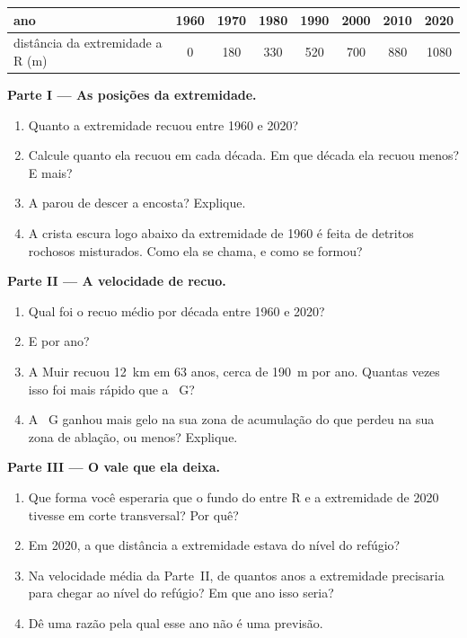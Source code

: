 \begin{problem}
\begin{center}
\smallskip
{\small
\begin{tabular}{|l|c|c|c|c|c|c|c|}
\hline
ano & 1960 & 1970 & 1980 & 1990 & 2000 & 2010 & 2020 \\
\hline
distância da extremidade a R (m) & 0 & 180 & 330 & 520 & 700 & 880 & 1080 \\
\hline
\end{tabular}}
\end{center}

\noindent\textbf{Parte I --- As posições da extremidade.}\par\nopagebreak
\begin{enumerate}[beginpenalty=10000]
  \item Quanto a extremidade recuou entre 1960 e 2020?
  \item Calcule quanto ela recuou em cada década. Em que década ela recuou
        menos? E mais?
  \item A  parou de descer a encosta? Explique.
  \item A crista escura logo abaixo da extremidade de 1960 é feita de
        detritos rochosos misturados. Como ela se chama, e como se formou?
\end{enumerate}

\noindent\textbf{Parte II --- A velocidade de recuo.}\par\nopagebreak
\begin{enumerate}[resume, beginpenalty=10000]
  \item Qual foi o recuo médio por década entre 1960 e 2020?
  \item E por ano?
  \item A  Muir recuou \qty{12}{km} em 63 anos, cerca de
        \qty{190}{m} por ano. Quantas vezes isso foi mais rápido que a
        ~G?
  \item A ~G ganhou mais gelo na sua zona de acumulação do que
        perdeu na sua zona de ablação, ou menos? Explique.
\end{enumerate}

\noindent\textbf{Parte III --- O vale que ela deixa.}\par\nopagebreak
\begin{enumerate}[resume, beginpenalty=10000]
  \item Que forma você esperaria que o fundo do  entre R e a
        extremidade de 2020 tivesse em corte transversal? Por quê?
  \item Em 2020, a que distância a extremidade estava do nível do refúgio?
  \item Na velocidade média da Parte~II, de quantos anos a extremidade
        precisaria para chegar ao nível do refúgio? Em que ano isso seria?
  \item Dê uma razão pela qual esse ano não é uma previsão.
\end{enumerate}
\end{problem}

